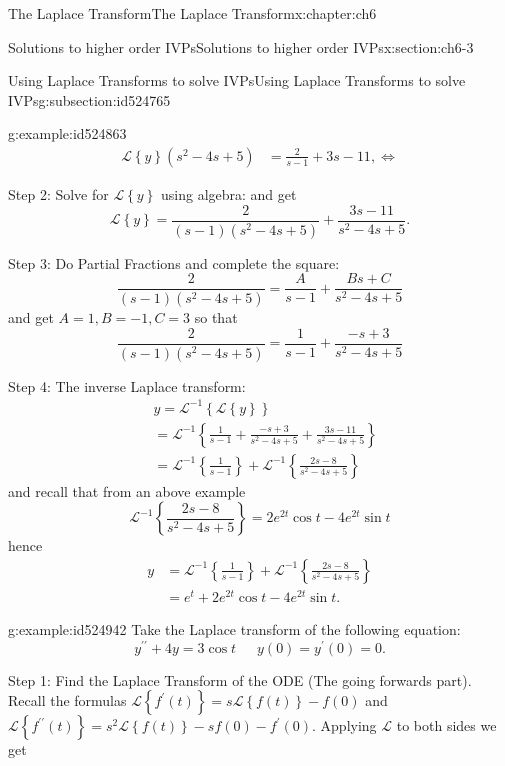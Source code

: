 \documentclass[oneside,10pt,]{book}
\numberwithin{equation}{section}
\numberwithin{equation}{section}
\newcommand{\amp}{&}
\begin{document}
\begin{chapterptx}{The Laplace Transform}{}{The Laplace Transform}{}{}{x:chapter:ch6}
\begin{sectionptx}{Solutions to higher order IVPs}{}{Solutions to higher order IVPs}{}{}{x:section:ch6-3}
\begin{subsectionptx}{Using Laplace Transforms to solve IVPs}{}{Using Laplace Transforms to solve IVPs}{}{}{g:subsection:id524765}
\begin{example}{}{g:example:id524863}
\begin{align*}
\mathcal{L}\left\{ y\right\} \left(s^{2}-4s+5\right) \amp =\frac{2}{s-1}+3s-11,\iff
\end{align*}
%
\par
Step 2: Solve for \(\mathcal{L}\left\{ y\right\} \) using algebra: and get%
\begin{equation*}
\mathcal{L}\left\{ y\right\} =\frac{2}{\left(s-1\right)\left(s^{2}-4s+5\right)}+\frac{3s-11}{s^{2}-4s+5}.
\end{equation*}
%
\par
Step 3: Do Partial Fractions and complete the square:%
\begin{equation*}
\frac{2}{\left(s-1\right)\left(s^{2}-4s+5\right)}=\frac{A}{s-1}+\frac{Bs+C}{s^{2}-4s+5}
\end{equation*}
and get \(A=1,B=-1,C=3\) so that%
\begin{equation*}
\frac{2}{\left(s-1\right)\left(s^{2}-4s+5\right)}=\frac{1}{s-1}+\frac{-s+3}{s^{2}-4s+5}
\end{equation*}
%
\par
Step 4: The inverse Laplace transform:%
\begin{align*}
\amp y=\mathcal{L}^{-1}\left\{ \mathcal{L}\left\{ y\right\} \right\} \\
\amp =\mathcal{L}^{-1}\left\{ \frac{1}{s-1}+\frac{-s+3}{s^{2}-4s+5}+\frac{3s-11}{s^{2}-4s+5}\right\} \\
\amp =\mathcal{L}^{-1}\left\{ \frac{1}{s-1}\right\} +\mathcal{L}^{-1}\left\{ \frac{2s-8}{s^{2}-4s+5}\right\} 
\end{align*}
and recall that from an above example%
\begin{equation*}
\mathcal{L}^{-1}\left\{ \frac{2s-8}{s^{2}-4s+5}\right\} =2e^{2t}\cos t-4e^{2t}\sin t
\end{equation*}
hence%
\begin{align*}
y \amp =\mathcal{L}^{-1}\left\{ \frac{1}{s-1}\right\} +\mathcal{L}^{-1}\left\{ \frac{2s-8}{s^{2}-4s+5}\right\} \\
\amp =e^{t}+2e^{2t}\cos t-4e^{2t}\sin t.
\end{align*}
%
\end{example}
\begin{example}{}{g:example:id524942}%
Take the Laplace transform of the following equation:%
\begin{equation*}
y^{\prime\prime}+4y=3\cos t\,\,\,\,\,\,\,\,\,y(0)=y^{\prime}(0)=0.
\end{equation*}
%
\par
Step 1: Find the Laplace Transform of the ODE (The going forwards part). Recall the formulas \(\mathcal{L}\left\{ f^{\prime}(t)\right\} =s\mathcal{L}\left\{ f(t)\right\} -f(0)\) and \(\mathcal{L}\left\{ f^{\prime\prime}(t)\right\} =s^{2}\mathcal{L}\left\{ f(t)\right\} -sf(0)-f^{\prime}(0)\). Applying \(\mathcal{L}\) to both sides we get%

\end{example}
\end{subsectionptx}
\end{sectionptx}
\end{chapterptx}
\end{document}
